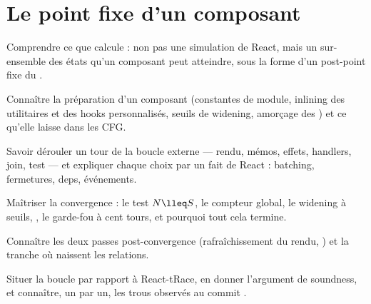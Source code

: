 \chapter{Le point fixe d'un composant}
\label{chap:point-fixe-composant}

\begin{objectifs}
  \item Comprendre ce que calcule  : non pas une simulation de React, mais un sur-ensemble des états qu'un composant peut atteindre, sous la forme d'un post-point fixe du .
  \item Connaître la préparation d'un composant (constantes de module, inlining des utilitaires et des hooks personnalisés, seuils de widening, amorçage des ) et ce qu'elle laisse dans les CFG.
  \item Savoir dérouler un tour de la boucle externe --- rendu, mémos, effets, handlers, join, test --- et expliquer chaque choix par un fait de React : batching, fermetures, deps, événements.
  \item Maîtriser la convergence : le test $N \lleq S$, le compteur global, le widening à seuils, , le garde-fou à cent tours, et pourquoi tout cela termine.
  \item Connaître les deux passes post-convergence (rafraîchissement du rendu, ) et la tranche où naissent les relations.
  \item Situer la boucle par rapport à React-tRace, en donner l'argument de soundness, et connaître, un par un, les trous observés au commit \snapshotCommit.
\end{objectifs}


